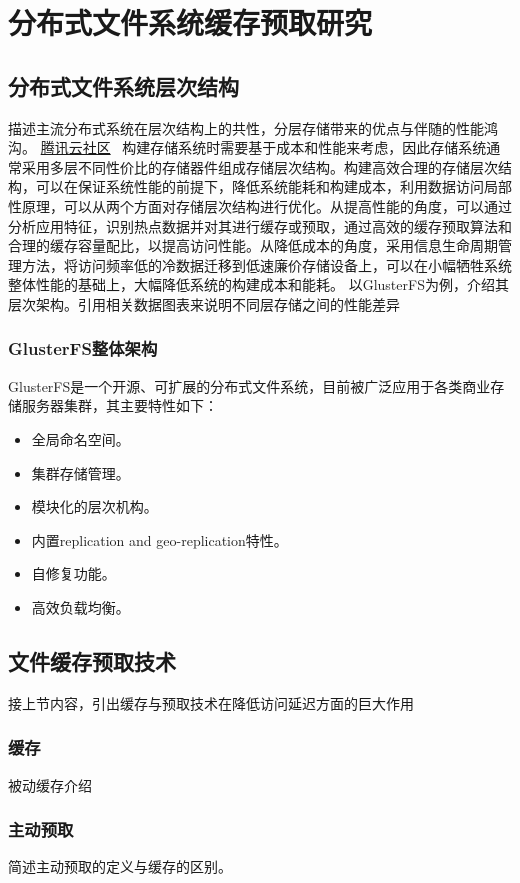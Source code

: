 \chapter{分布式文件系统缓存预取研究}

\section{分布式文件系统层次结构}
{\color{red}描述主流分布式系统在层次结构上的共性，分层存储带来的优点与伴随的性能鸿沟。}
\href{https://cloud.tencent.com/developer/news/280684}{腾讯云社区}~
构建存储系统时需要基于成本和性能来考虑，因此存储系统通常采用多层不同性价比的存储器件组成存储层次结构。构建高效合理的存储层次结构，可以在保证系统性能的前提下，降低系统能耗和构建成本，利用数据访问局部性原理，可以从两个方面对存储层次结构进行优化。从提高性能的角度，可以通过分析应用特征，识别热点数据并对其进行缓存或预取，通过高效的缓存预取算法和合理的缓存容量配比，以提高访问性能。从降低成本的角度，采用信息生命周期管理方法，将访问频率低的冷数据迁移到低速廉价存储设备上，可以在小幅牺牲系统整体性能的基础上，大幅降低系统的构建成本和能耗。
{\color{red}以GlusterFS为例，介绍其层次架构。引用相关数据图表来说明不同层存储之间的性能差异}
\subsection{GlusterFS整体架构}
GlusterFS\cite{GlusterFS}是一个开源、可扩展的分布式文件系统，目前被广泛应用于各类商业存储服务器集群，其主要特性如下：
\begin{itemize}
    \item 全局命名空间。
    \item 集群存储管理。
    \item 模块化的层次机构。
    \item 内置replication and geo-replication特性。
    \item 自修复功能。
    \item 高效负载均衡。
\end{itemize}

\section{文件缓存预取技术}
{\color{red}接上节内容，引出缓存与预取技术在降低访问延迟方面的巨大作用}
\subsection{缓存}
{\color{red}被动缓存介绍}
\subsection{主动预取}
{\color{red}简述主动预取的定义与缓存的区别。}
